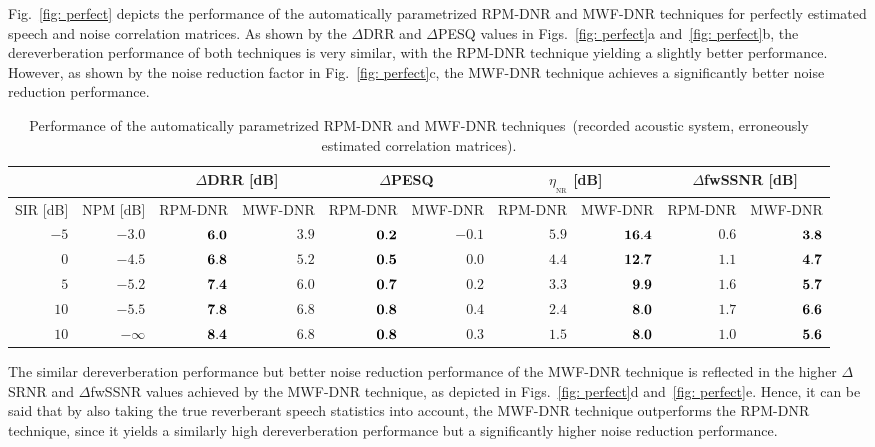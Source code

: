 \documentclass[10pt]{IEEEtran}
\begin{document}
Fig.~\ref{fig: perfect} depicts the performance of the automatically parametrized RPM-DNR and MWF-DNR techniques for perfectly estimated speech and noise correlation matrices.
As shown by the $\Delta$DRR and $\Delta$PESQ values in Figs.~\ref{fig: perfect}a and~\ref{fig: perfect}b, the dereverberation performance of both techniques is very similar, with the RPM-DNR technique yielding a slightly better performance.
However, as shown by the noise reduction factor in Fig.~\ref{fig: perfect}c, the MWF-DNR technique achieves a significantly better noise reduction performance.
\begin{table}[t]
  \def\tabcolsep{8pt}
  \caption{Performance of the automatically parametrized RPM-DNR and MWF-DNR techniques~(recorded acoustic system, erroneously estimated correlation matrices).}
  \label{tbl: ssi}
  \begin{tabularx}{\linewidth}{rrrrrrrrrr}
    \toprule
& &    \multicolumn{2}{c}{$\Delta$DRR [dB]} & \multicolumn{2}{c}{$\Delta$PESQ} & \multicolumn{2}{c}{$\eta_{_{\text{NR}}}$ [dB]} & \multicolumn{2}{c}{$\Delta$fwSSNR [dB]} \\
    \midrule
  SIR [dB] & NPM [dB] & RPM-DNR & MWF-DNR &  RPM-DNR & MWF-DNR & RPM-DNR & MWF-DNR & RPM-DNR & MWF-DNR \\
    $-5$ & $-3.0$ & $\bf{6.0}$ & $3.9$ & $\bf{0.2}$ & $-0.1$ & $5.9$ & $\bf{16.4}$ & $0.6$ & $\bf{3.8}$ \\
    $0$ & $-4.5$ & $\bf{6.8}$ & $5.2$ & $\bf{0.5}$ & $0.0$ & $4.4$ & $\bf{12.7}$ & $1.1$ & $\bf{4.7}$ \\
    $5$ & $-5.2$ & $\bf{7.4}$ & $6.0$ & $\bf 0.7$ & $0.2$ & $3.3$ & $\bf{9.9}$ & $1.6$ & $\bf{5.7}$ \\
    $10$ & $-5.5$ & $\bf{7.8}$ & $6.8$ & $\bf 0.8$ & $0.4$ & $2.4$ & $\bf{8.0}$ & $1.7$ & $\bf{6.6}$ \\
    $10$ & $-\infty$ & $\bf{8.4}$ & $6.8$ & $\bf 0.8$ & $0.3$  & $1.5$ & $\bf{8.0}$ & $1.0$ & $\bf{5.6}$ \\
    \bottomrule
  \end{tabularx}
\end{table}
The similar dereverberation performance but better noise reduction performance of the MWF-DNR technique is reflected in the higher $\Delta$SRNR and $\Delta$fwSSNR values achieved by the MWF-DNR technique, as depicted in Figs.~\ref{fig: perfect}d and~\ref{fig: perfect}e.
Hence, it can be said that by also taking the true reverberant speech statistics into account, the MWF-DNR technique outperforms the RPM-DNR technique, since it yields a similarly high dereverberation performance but a significantly higher noise reduction performance. 
\end{document}
